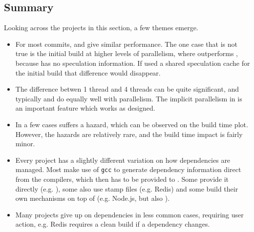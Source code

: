 


\subsection{Summary}

Looking across the projects in this section, a few themes emerge.

\begin{itemize}
\item For most commits, \Rattle and \Make give similar performance. The one case that is not true is the initial build at higher levels of parallelism, where \Make outperforms \Rattle, because \Rattle has no speculation information. If \Rattle used a shared speculation cache for the initial build that difference would disappear.
\item The difference betwen 1 thread and 4 threads can be quite significant, and typically \Make and \Rattle do equally well with parallelism. The implicit parallelism in \Rattle is an important feature which works as designed.
\item In a few cases \Rattle suffers a hazard, which can be observed on the build time plot. However, the hazards are relatively rare, and the build time impact is fairly minor.
\item Every \Make project has a slightly different variation on how dependencies are managed. Most make use of \texttt{gcc} to generate dependency information direct from the compilers, which then has to be provided to \Make. Some provide it directly (e.g. \Fsatrace), some also use stamp files (e.g. Redis) and some build their own mechanisms on top of \Make (e.g. Node.js, but also \citet[\S2]{hadrian}).
\item Many projects give up on dependencies in less common cases, requiring user action, e.g. Redis requires a clean build if a dependency changes.
\end{itemize}

